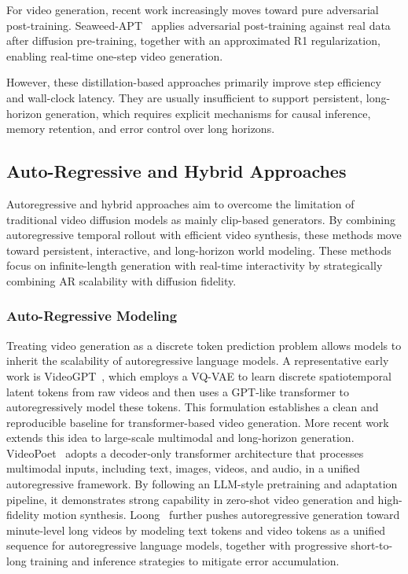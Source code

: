 \documentclass[lettersize,journal]{IEEEtran}
\begin{document}
For video generation, recent work increasingly moves toward pure adversarial post-training. Seaweed-APT~\cite{lin2025seaweedapt} applies adversarial post-training against real data after diffusion pre-training, together with an approximated R1 regularization, enabling real-time one-step video generation.


However, these distillation-based approaches primarily improve step efficiency and wall-clock latency. They are usually insufficient to support persistent, long-horizon generation, which requires explicit mechanisms for causal inference, memory retention, and error control over long horizons.


\subsection{Auto-Regressive and Hybrid Approaches}
\label{subsec:hyperapproach}
Autoregressive and hybrid approaches aim to overcome the limitation of traditional video diffusion models as mainly clip-based generators. By combining autoregressive temporal rollout with efficient video synthesis, these methods move toward persistent, interactive, and long-horizon world modeling.
These methods focus on infinite-length generation with real-time interactivity by strategically combining AR scalability with diffusion fidelity.

\subsubsection{Auto-Regressive Modeling}
Treating video generation as a discrete token prediction problem allows models to inherit the scalability of autoregressive language models. A representative early work is VideoGPT~\cite{yan2021videogpt}, which employs a VQ-VAE to learn discrete spatiotemporal latent tokens from raw videos and then uses a GPT-like transformer to autoregressively model these tokens. This formulation establishes a clean and reproducible baseline for transformer-based video generation. More recent work extends this idea to large-scale multimodal and long-horizon generation. VideoPoet~\cite{kondratyuk2023videopoet} adopts a decoder-only transformer architecture that processes multimodal inputs, including text, images, videos, and audio, in a unified autoregressive framework. By following an LLM-style pretraining and adaptation pipeline, it demonstrates strong capability in zero-shot video generation and high-fidelity motion synthesis. 
Loong~\cite{wang2024loong} further pushes autoregressive generation toward minute-level long videos by modeling text tokens and video tokens as a unified sequence for autoregressive language models, together with progressive short-to-long training and inference strategies to mitigate error accumulation.
\end{document}
